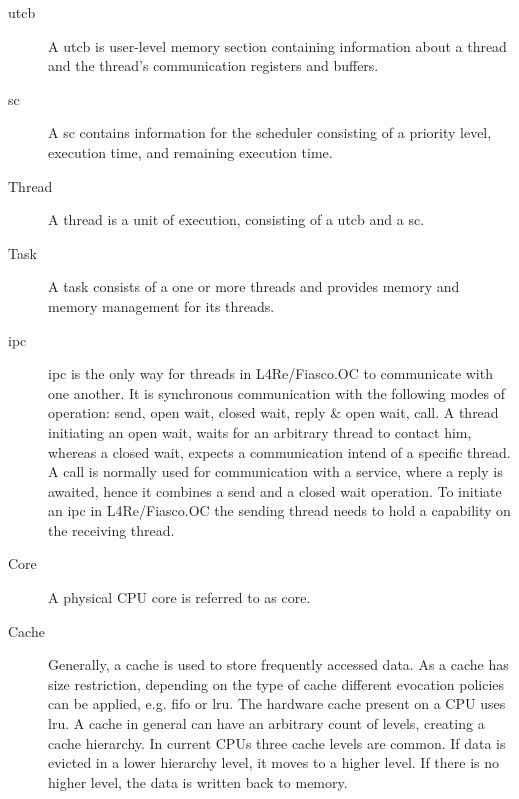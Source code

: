 \begin{description}
  \item[\Gls{utcb}] A \gls{utcb} is user-level memory section containing
    information about a thread and the thread's communication registers and
    buffers.

  \item[\Gls{sc}] A \gls{sc} contains information for the scheduler consisting
    of a priority level, execution time, and remaining execution time.

  \item[Thread] A thread is a unit of execution, consisting of a \gls{utcb}
    and a \gls{sc}.

  \item[Task] A task consists of a one or more threads and provides memory and
    memory management for its threads.

  \item[\Gls{ipc}] \Gls{ipc} is the only way for threads in L4Re/Fiasco.OC
    to communicate with one another.
    It is synchronous communication with the following modes of operation:
    send, open wait, closed wait, reply \& open wait, call.
    A thread initiating an open wait, waits for an arbitrary thread to contact
    him, whereas a closed wait, expects a communication intend of a specific
    thread.
    A call is normally used for communication with a service, where a reply is
    awaited, hence it combines a send and a closed wait operation.
    To initiate an \gls{ipc} in L4Re/Fiasco.OC the sending thread needs to hold
    a capability on the receiving thread.


  \item[Core] A physical CPU core is referred to as core.

  \item[Cache] Generally, a cache is used to store frequently accessed data.
    As a cache has size restriction, depending on the type of cache different
    evocation policies can be applied, e.g. \gls{fifo} or \gls{lru}.
    The hardware cache present on a CPU uses \gls{lru}.
    A cache in general can have an arbitrary count of levels, creating a cache
    hierarchy.
    In current CPUs three cache levels are common.
    If data is evicted in a lower hierarchy level, it moves to a higher level.
    If there is no higher level, the data is written back to memory.


\end{description}
